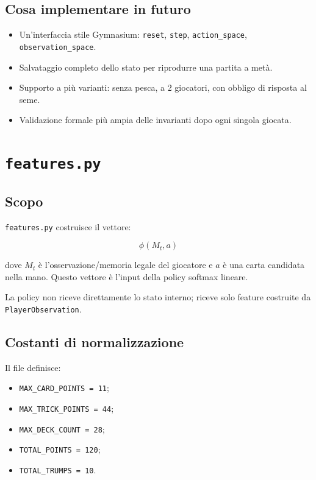 \documentclass[11pt,a4paper]{article}
\begin{document}
\subsection{Cosa implementare in futuro}

\begin{itemize}
  \item Un'interfaccia stile Gymnasium: \texttt{reset}, \texttt{step},
  \texttt{action\_space}, \texttt{observation\_space}.
  \item Salvataggio completo dello stato per riprodurre una partita a metà.
  \item Supporto a più varianti: senza pesca, a 2 giocatori, con obbligo di
  risposta al seme.
  \item Validazione formale più ampia delle invarianti dopo ogni singola giocata.
\end{itemize}

\section{\texttt{features.py}}

\subsection{Scopo}

\texttt{features.py} costruisce il vettore:

\[
\phi(M_t,a)
\]

dove \(M_t\) è l'osservazione/memoria legale del giocatore e \(a\) è una carta
candidata nella mano. Questo vettore è l'input della policy softmax lineare.

La policy non riceve direttamente lo stato interno; riceve solo feature costruite
da \texttt{PlayerObservation}.

\subsection{Costanti di normalizzazione}

Il file definisce:

\begin{itemize}
  \item \texttt{MAX\_CARD\_POINTS = 11};
  \item \texttt{MAX\_TRICK\_POINTS = 44};
  \item \texttt{MAX\_DECK\_COUNT = 28};
  \item \texttt{TOTAL\_POINTS = 120};
  \item \texttt{TOTAL\_TRUMPS = 10}.
\end{itemize}
\end{document}
